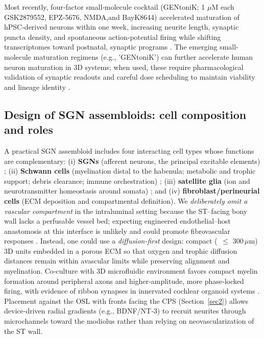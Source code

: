 \documentclass[referee,pdflatex, sn-vancouver-num]{sn-jnl}%
\theoremstyle{thmstyleone}%
\theoremstyle{thmstyletwo}%
\theoremstyle{thmstylethree}%
\begin{document}
Most recently, four‑factor small‑molecule cocktail (GENtoniK; 1 $\mu$M each GSK2879552, EPZ‑5676, NMDA,and BayK8644) accelerated maturation of hPSC‑derived neurons within one week, increasing neurite length, synaptic puncta density, and spontaneous action‑potential firing while shifting transcriptomes toward postnatal, synaptic programs \cite{Hergenreder:2024aa}. The emerging small-molecule maturation regimens (e.g., 'GENtoniK') can further accelerate human neuron maturation in 3D systems; when used, these require pharmacological validation of synaptic readouts and careful dose scheduling to maintain viability and lineage identity \citep{Hergenreder2024NatBiotech}.

\subsection{Design of SGN assembloids: cell composition and roles}
A practical SGN assembloid includes four interacting cell types whose functions are complementary: (i) \textbf{SGNs} (afferent neurons, the principal excitable elements) \cite{matsuoka_2017}; (ii) \textbf{Schwann cells} (myelination distal to the habenula; metabolic and trophic support; debris clearance; immune orchestration) \citep{Oliveira2023FrontiersPN,Moss2024iScience}; (iii) \textbf{satellite glia} (ion and neurotransmitter homeostasis around somata) \cite{Meas2018}; and (iv) \textbf{fibroblast/perineurial cells} (ECM deposition and compartmental definition)\cite{Constantin2024}. We \emph{deliberately omit a vascular compartment} in the intraluminal setting because the ST–facing bony wall lacks a perfusable vessel bed; expecting engineered endothelial–host anastomosis at this interface is unlikely and could promote fibrovascular responses \cite{Wright2018}. Instead, one could use a \emph{diffusion‑first} design: compact (~\(\leq\) 300\,\(\mu\)m) 3D units embedded in a porous ECM so that oxygen and trophic diffusion distances remain within avascular limits while preserving alignment and myelination. Co‑culture with 3D microfluidic environment favors compact myelin formation around peripheral axons and higher‑amplitude, more phase‑locked firing, with evidence of ribbon synapses in innervated cochlear organoid systems \citep{Xia2023StemCellReports}. Placement against the OSL with fronts facing the CPS (Section~\ref{sec2}) allows device‑driven radial gradients (e.g., BDNF/NT‑3) to recruit neurites through microchannels toward the modiolus rather than relying on neovascularization of the ST wall.
\end{document}

